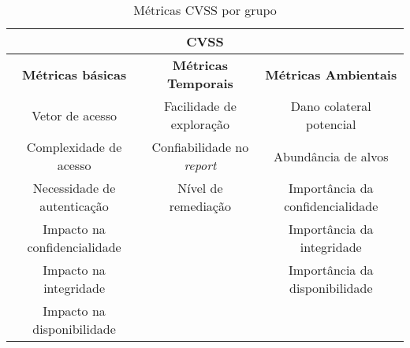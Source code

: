 			\begin{table}
				\begin{tabular}{|c|c|c|}
					\hline
					\multicolumn{3}{|c|}{ \textbf{CVSS} } \\
					\hline
					\textbf{Métricas básicas} & \textbf{Métricas Temporais} & \textbf{Métricas Ambientais} \\
					\hline
					Vetor de acesso & Facilidade de exploração & Dano colateral potencial \\
					Complexidade de acesso & Confiabilidade no \textsl{report} & Abundância de alvos\\
					Necessidade de autenticação & Nível de remediação & Importância da confidencialidade \\
					Impacto na confidencialidade & & Importância da integridade\\
					Impacto na integridade & & Importância da disponibilidade \\
					Impacto na disponibilidade & &  \\
					\hline
				\end{tabular}
				\caption{Métricas CVSS por grupo}\label{tab:grupos_cvss}
			\end{table}
			
